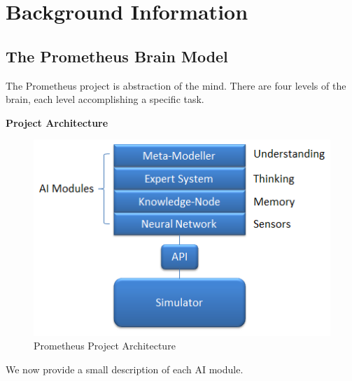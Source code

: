 \documentclass[titlepage, 12pt]{article}
\begin{document}
\section{Background Information}

\subsection{The Prometheus Brain Model}

The Prometheus project is abstraction of the mind. There are four levels of the brain, each level accomplishing a specific task. \\

\begin{center}
{\bf Project Architecture} 
\end{center}

\begin{figure}[h!]
    \centering
    \includegraphics{aimodules.png}
\caption{Prometheus Project Architecture}
\end{figure}

We now provide a small description of each AI module. 
\end{document}
